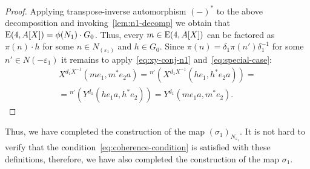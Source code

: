 \begin{proof}
    Applying transpose-inverse automorphism $(-)^*$ to the above decomposition and invoking~\cref{lem:n1-decomp} we obtain that $\operatorname{E}(4, A[X]) = \phi(N_1) \cdot G_0$.
    Thus, every $m \in \operatorname{E}(4, A[X])$ can be factored as $\pi(n) \cdot h$ for some $n\in N_(\varepsilon_1)$ and $h \in G_0$.
    Since $\pi(n) = \delta_1 \pi(n') \delta_1^{-1}$ for some $n' \in N(-\varepsilon_1)$ it remains to apply~\eqref{eq:xy-conj-n1} and~\eqref{eq:special-case}:
    \begin{multline}
        \nonumber X^{d_1 X^{-1}}(me_1, m^*e_{2}a) = {}^{n'}(X^{d_1 X^{-1}}(he_1, h^*e_{2}a)) = \\
        = {}^{n'}(Y^{d_1}(he_{1}a, h^*e_2)) = Y^{d_1}(me_{1}a, m^{*} e_{2}).
    \end{multline}
\end{proof}

Thus, we have completed the construction of the map $(\sigma_1)_{N_{\varepsilon_1}}$.
It is not hard to verify that the condition~\eqref{eq:coherence-condition} is satisfied with these definitions,
therefore, we have also completed the construction of the map $\sigma_1$.
